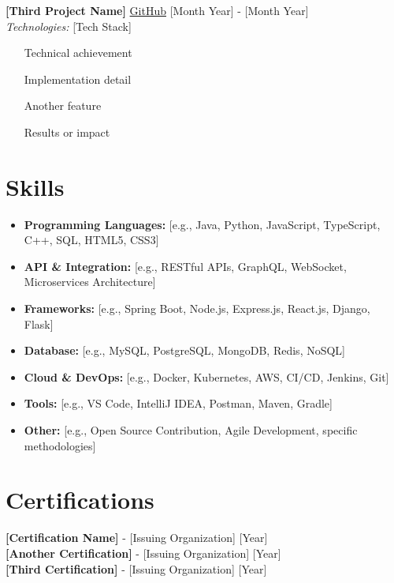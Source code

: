 \documentclass[10pt,letterpaper]{article}
\begin{document}
\vspace{0.2cm}

\textbf{[Third Project Name]} \href{https://github.com/yourusername/project}{GitHub} \hfill [Month Year] - [Month Year] \\
\textit{Technologies:} [Tech Stack]
\begin{itemize}[leftmargin=*,label={\color{darkgray}\textbullet},itemsep=1pt]
    \item [Technical achievement]
    \item [Implementation detail]
    \item [Another feature]
    \item [Results or impact]
\end{itemize}

\section*{Skills}
\begin{itemize}[leftmargin=*,label={\color{darkgray}\textbullet},itemsep=1pt]
    \item \textbf{Programming Languages:} [e.g., Java, Python, JavaScript, TypeScript, C++, SQL, HTML5, CSS3]
    \item \textbf{API \& Integration:} [e.g., RESTful APIs, GraphQL, WebSocket, Microservices Architecture]
    \item \textbf{Frameworks:} [e.g., Spring Boot, Node.js, Express.js, React.js, Django, Flask]
    \item \textbf{Database:} [e.g., MySQL, PostgreSQL, MongoDB, Redis, NoSQL]
    \item \textbf{Cloud \& DevOps:} [e.g., Docker, Kubernetes, AWS, CI/CD, Jenkins, Git]
    \item \textbf{Tools:} [e.g., VS Code, IntelliJ IDEA, Postman, Maven, Gradle]
    \item \textbf{Other:} [e.g., Open Source Contribution, Agile Development, specific methodologies]
\end{itemize}

\section*{Certifications}
\textbf{[Certification Name]} - [Issuing Organization] \hfill [Year] \\
\textbf{[Another Certification]} - [Issuing Organization] \hfill [Year] \\
\textbf{[Third Certification]} - [Issuing Organization] \hfill [Year]
\end{document}
